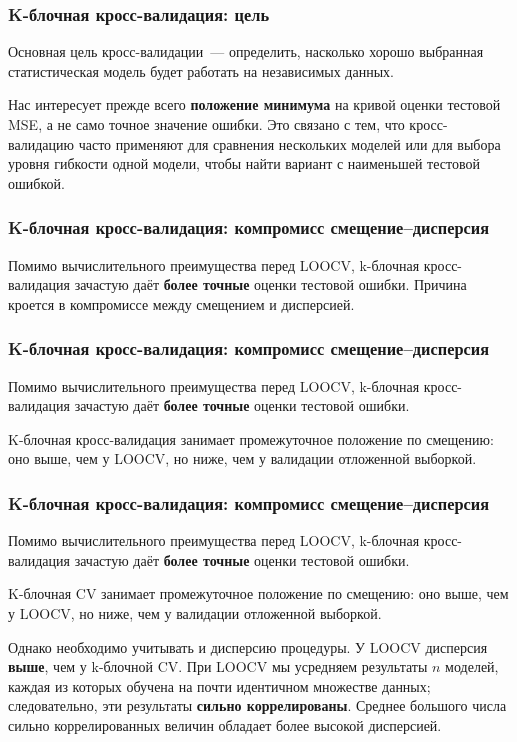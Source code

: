 \documentclass{beamer}
\begin{document}
\begin{frame}
  \frametitle{K-блочная кросс-валидация: цель}

  Основная цель кросс-валидации~--- определить, насколько хорошо выбранная статистическая модель будет работать на независимых данных.

  \vspace{0.3cm}

  Нас интересует прежде всего \textbf{положение минимума} на кривой оценки тестовой MSE, а не само точное значение ошибки. Это связано с тем, что кросс-валидацию часто применяют для сравнения нескольких моделей или для выбора уровня гибкости одной модели, чтобы найти вариант с наименьшей тестовой ошибкой.

\end{frame}

\begin{frame}
  \frametitle{K-блочная кросс-валидация: компромисс смещение--дисперсия}

  Помимо вычислительного преимущества перед LOOCV, k-блочная кросс-валидация зачастую даёт \textbf{более точные} оценки тестовой ошибки. Причина кроется в компромиссе между смещением и дисперсией.

\end{frame}

\begin{frame}
  \frametitle{K-блочная кросс-валидация: компромисс смещение--дисперсия}

  Помимо вычислительного преимущества перед LOOCV, k-блочная кросс-валидация зачастую даёт \textbf{более точные} оценки тестовой ошибки.

  \vspace{0.3cm}

  K-блочная кросс-валидация занимает промежуточное положение по смещению: оно выше, чем у LOOCV, но ниже, чем у валидации отложенной выборкой.

\end{frame}

\begin{frame}
  \frametitle{K-блочная кросс-валидация: компромисс смещение--дисперсия}

  Помимо вычислительного преимущества перед LOOCV, k-блочная кросс-валидация зачастую даёт \textbf{более точные} оценки тестовой ошибки.

  \vspace{0.2cm}

  K-блочная CV занимает промежуточное положение по смещению: оно выше, чем у LOOCV, но ниже, чем у валидации отложенной выборкой.

  \vspace{0.2cm}

  Однако необходимо учитывать и дисперсию процедуры. У LOOCV дисперсия \textbf{выше}, чем у k-блочной CV. При LOOCV мы усредняем результаты $n$ моделей, каждая из которых обучена на почти идентичном множестве данных; следовательно, эти результаты \textbf{сильно коррелированы}. Среднее большого числа сильно коррелированных величин обладает более высокой дисперсией.

\end{frame}
\end{document}
